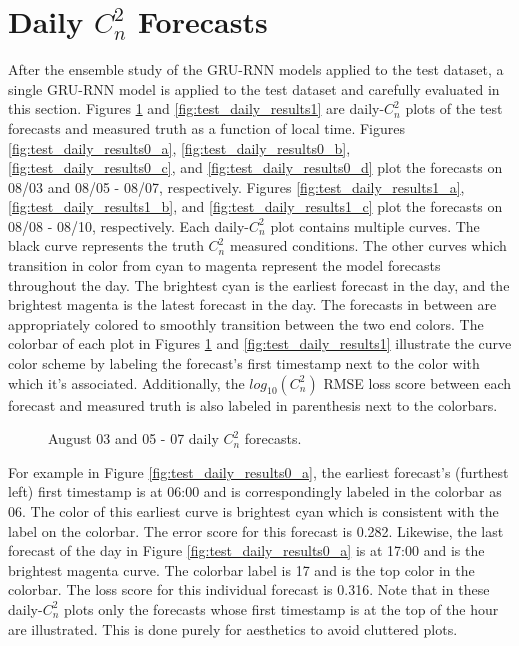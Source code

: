 \section{Daily $C_{n}^{2}$ Forecasts}
\label{sec:daily_cn2_forecasts}
After the ensemble study of the \ac{GRU-RNN} models applied to the test dataset, a single \ac{GRU-RNN} model is applied to the test dataset and carefully evaluated in this section. Figures \ref{fig:test_daily_results0} and \ref{fig:test_daily_results1} are daily-$C_{n}^{2}$ plots of the test forecasts and measured truth as a function of local time. Figures \ref{fig:test_daily_results0_a}, \ref{fig:test_daily_results0_b}, \ref{fig:test_daily_results0_c}, and \ref{fig:test_daily_results0_d} plot the forecasts on 08/03 and 08/05 - 08/07, respectively.  Figures \ref{fig:test_daily_results1_a}, \ref{fig:test_daily_results1_b}, and \ref{fig:test_daily_results1_c} plot the forecasts on 08/08 - 08/10, respectively. Each daily-$C_{n}^{2}$ plot contains multiple curves. The black curve represents the truth $C_{n}^{2}$ measured conditions. The other curves which transition in color from cyan to magenta represent the model forecasts throughout the day. The brightest cyan is the earliest forecast in the day, and the brightest magenta is the latest forecast in the day. The forecasts in between are appropriately colored to smoothly transition between the two end colors. The colorbar of each plot in Figures \ref{fig:test_daily_results0} and \ref{fig:test_daily_results1} illustrate the curve color scheme by labeling the forecast's first timestamp next to the color with which it's associated. Additionally, the $log_{10}(C_{n}^{2})$ RMSE loss score between each forecast and measured truth is also labeled in parenthesis next to the colorbars.
\begin{figure}[h!]
	\centering
	\hfill
	\hfill
	\caption{August 03 and 05 - 07 daily $C_{n}^{2}$ forecasts.}
	\label{fig:test_daily_results0}
\end{figure}
For example in Figure \ref{fig:test_daily_results0_a}, the earliest forecast's (furthest left) first timestamp is at 06:00 and is correspondingly labeled in the colorbar as 06. The color of this earliest curve is brightest cyan which is consistent with the label on the colorbar. The error score for this forecast is 0.282. Likewise, the last forecast of the day in Figure \ref{fig:test_daily_results0_a} is at 17:00 and is the brightest magenta curve. The colorbar label is 17 and is the top color in the colorbar. The loss score for this individual forecast is 0.316. Note that in these daily-$C_{n}^{2}$ plots only the forecasts whose first timestamp is at the top of the hour are illustrated. This is done purely for aesthetics to avoid cluttered plots.

